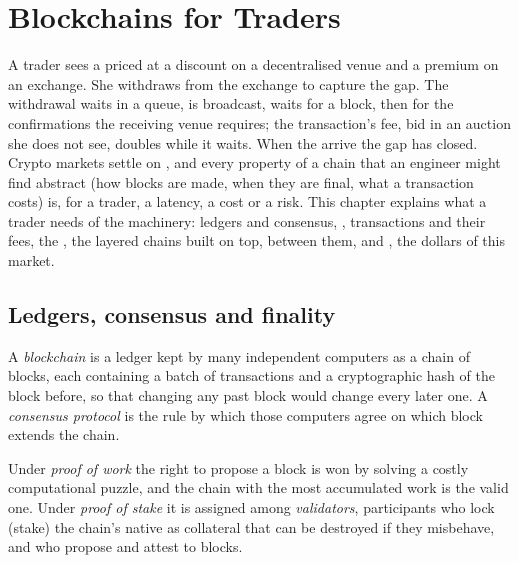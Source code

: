 \chapter{Blockchains for Traders}\label{ch:m3:blockchains-for-traders}

A trader sees a  priced at a discount on a decentralised venue and a premium on an
exchange. She withdraws  from the exchange to capture the gap. The withdrawal waits in a
queue, is broadcast, waits for a block, then for the confirmations the receiving venue requires;
the transaction's fee, bid in an auction she does not see, doubles while it waits. When the 
arrive the gap has closed. Crypto markets settle on , and every property of a chain
that an engineer might find abstract (how blocks are made, when they are final, what a transaction
costs) is, for a trader, a latency, a cost or a risk. This chapter explains what a trader needs of
the machinery: ledgers and consensus, , transactions and their fees, the , the
layered chains built on top,  between them, and , the dollars of this market.

\section{Ledgers, consensus and finality}

\begin{definition}\label{def:m3:blockchains-for-traders:chain}
A \emph{blockchain} is a ledger kept by many independent computers as a chain of
blocks, each containing a batch of transactions and a cryptographic hash of the block before, so that
changing any past block would change every later one. A \emph{consensus protocol} is the rule by which those computers agree on which block extends the chain.
\end{definition}

\begin{definition}\label{def:m3:blockchains-for-traders:pow}
Under \emph{proof of work} the right to propose a block is won by solving a
costly computational puzzle, and the chain with the most accumulated work is the valid one. Under
\emph{proof of stake} it is assigned among \emph{validators},
participants who lock (stake) the chain's native  as collateral that can be destroyed if they
misbehave, and who propose and attest to blocks.
\end{definition}

